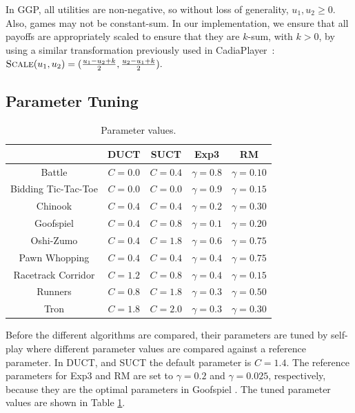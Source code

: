\documentclass[conference]{IEEEtran}
\newcommand{\Cadiaplayer}{{\sc CadiaPlayer}\xspace}
\begin{document}
In GGP, all utilities are non-negative, so without loss of generality, $u_1, u_2 \ge 0$.  
Also, games may not be constant-sum. In our implementation, we ensure that all payoffs 
are appropriately scaled to ensure that they are $k$-sum, with $k > 0$, by using 
a similar transformation previously used in \Cadiaplayer~\cite{Finnsson12}:
$\text{\sc Scale}(u_1, u_2) = (\frac{u_1 - u_2 + k}{2}, \frac{u_2 - u_1 + k}{2}).$

\subsection{Parameter Tuning}

\begin{table}[t!]
\centering
\begin{tabular}{|c|c|c|c|c|}
\hline
                  & DUCT    & SUCT    & Exp3           & RM  \\
\hline
Battle            & $C=0.0$ & $C=0.4$ & $\gamma = 0.8$ & $\gamma = 0.10$  \\ 
Bidding Tic-Tac-Toe  & $C=0.0$ & $C=0.0$ & $\gamma = 0.9$ & $\gamma = 0.15$   \\ 
Chinook           & $C=0.4$ & $C=0.4$ & $\gamma = 0.2$ & $\gamma = 0.30$ \\ 
Goofspiel         & $C=0.4$ & $C=0.8$ & $\gamma = 0.1$ & $\gamma = 0.20$ \\ 
Oshi-Zumo         & $C=0.4$ & $C=1.8$ & $\gamma = 0.6$ & $\gamma = 0.75$ \\ 
Pawn Whopping      & $C=0.4$ & $C=0.4$ & $\gamma = 0.4$ & $\gamma = 0.75$  \\ 
Racetrack Corridor & $C=1.2$ & $C=0.8$ & $\gamma = 0.4$ & $\gamma = 0.15$\\ 
Runners           & $C=0.8$ & $C=1.8$ & $\gamma = 0.3$ & $\gamma = 0.50$ \\
Tron              & $C=1.8$ & $C=2.0$ & $\gamma = 0.3$ & $\gamma = 0.30$ \\
 \hline
\end{tabular}
\caption{Parameter values. \label{tbl:parameters}}
\vspace{-1cm}
\end{table}


Before the different algorithms are compared, their parameters are tuned by self-play where different parameter 
values are compared against a reference parameter. In DUCT, and SUCT the default parameter is $C=1.4$. The reference
parameters for Exp3 and RM are set to $\gamma = 0.2$ and $\gamma = 0.025$, respectively, because they are the optimal 
parameters in Goofspiel \cite{Lanctot13Goofspiel}. The tuned parameter values are shown in Table \ref{tbl:parameters}. 
\end{document}

